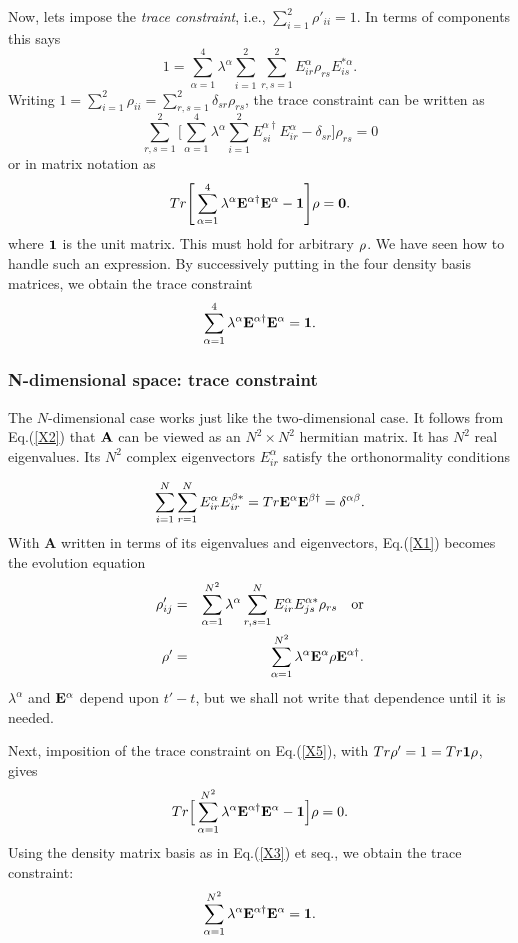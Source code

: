 \documentclass[aps,pra,twocolumn,amssymb, amsfonts,amsmath,showpacs, superscriptaddress]{revtex4}
\begin{document}
	Now, lets impose the \textit{trace  constraint}, i.e., $\sum_{i=1}^{2}\rho'_{ii}=1$.  In terms of components this says
\[
1=\sum_{\alpha=1}^{4}\lambda^{\alpha}\sum_{i=1}^{2}\sum_{r,s=1}^{2}E^{\alpha}_{ir}\rho_{rs}E^{*\alpha}_{is}.
\] 
\noindent Writing $1=\sum_{i=1}^{2}\rho_{ii}=\sum_{r,s=1}^{2}\delta_{sr}\rho_{rs}$, the trace  constraint can be written as 
\[
\sum_{r,s=1}^{2}\Bigg[\sum_{\alpha=1}^{4}\lambda^{\alpha}\sum_{i=1}^{2}E^{\alpha\dagger}_{si}E^{\alpha}_{ir}-\delta_{sr}\Bigg]\rho_{rs}=0
\]
\noindent or in matrix notation as
\[
Tr\Bigg[\sum_{\alpha=1}^{4}\lambda^{\alpha}{\bf E}^{\alpha\dagger}\bf E^{\alpha}-{\bf 1}\Bigg]{\bf \rho}=0.
\]
\noindent where ${\bf 1}$ is the unit matrix. This must hold for arbitrary ${\bf \rho}$.  We have seen how to handle 
such an expression.  By successively putting in the four density basis matrices, we obtain the trace constraint
\[
\sum_{\alpha=1}^{4}\lambda^{\alpha}{\bf E}^{\alpha\dagger}\bf E^{\alpha}=\bf 1.
\] 

\subsubsection{N-dimensional space: trace constraint}


The $N$-dimensional case works just like the two-dimensional case. It  follows from Eq.(\ref{X2}) that ${\bf A}$ can be viewed as  an $N^{2}\times N^{2}$ hermitian matrix.  It has $N^{2}$ real eigenvalues. Its  $N^{2}$  complex eigenvectors $E_{ir}^{\alpha}$ satisfy the orthonormality conditions

\begin{equation}\label{X4a}
\sum_{i=1}^{N}\sum_{r=1}^{N}E_{ir}^{\alpha}E_{ir}^{\beta*}
=Tr{\bf E}^{\alpha}{\bf E}^{\beta\dagger} =\delta^{\alpha\beta}.
\end{equation}
\noindent With {\bf A}  written in terms of its eigenvalues and eigenvectors, Eq.(\ref{X1}) becomes the evolution equation 
\begin{eqnarray}\label{X5}
\rho'_{ij}&=&\sum_{\alpha=1}^{N^{2}}\lambda^{\alpha}\sum_{r,s=1}^{N}E_{ir}^{\alpha}E_{js}^{\alpha*}\rho_{rs}\quad\hbox{or}\nonumber\\
 {\bf \rho}'&=&\sum_{\alpha=1}^{N^{2}}\lambda^{\alpha}{\bf E}^{\alpha}{\bf\rho} {\bf E}^{\alpha\dagger}.
\end{eqnarray}
\noindent  $\lambda^{\alpha}$ and ${\bf E}^{\alpha}$ depend upon $t'-t$, but we shall not write that dependence until it is needed.  


	Next, imposition of the trace constraint on Eq.(\ref{X5}),  with  $Tr{\bf \rho}'=1=Tr{\bf 1\rho}$,  gives
\[
Tr\Big[\sum_{\alpha=1}^{N^{2}}\lambda^{\alpha}{\bf E}^{\alpha\dagger}{\bf E}^{\alpha}-{\bf 1}\Big]{\bf \rho} =0.
\]
\noindent Using the density matrix basis as in Eq.(\ref{X3}) et seq., we obtain the trace constraint: 
\begin{equation}\label{X6}
\sum_{\alpha=1}^{N^{2}}\lambda^{\alpha}{\bf E}^{\alpha\dagger}{\bf E}^{\alpha}={\bf 1}.
\end{equation}
\end{document}
